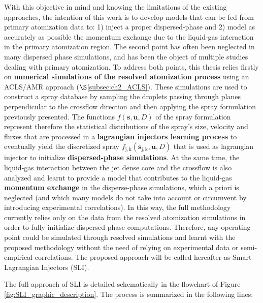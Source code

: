 With this objective in mind and knowing the limitations of the existing approaches, the intention of this work is to develop models that can be fed from primary atomization data to: 1) inject a proper dispersed-phase and 2) model as accurately as possible the momentum exchange due to the liquid-gas interaction in the primary atomization region. The second point has often been neglected in many dispersed phase simulations, and has been the object of multiple studies dealing with primary atomization. To address both points, this thesis relies firstly on \textbf{numerical simulations of the resolved atomization process} using an ACLS/AMR approach ($\S$\ref{subsec:ch2_ACLS}). These simulations are used to construct a spray database by sampling the droplets passing through planes perpendicular to the crossflow direction and then applying the spray formulation previously presented. The functions $f \left( \boldsymbol{s}, \boldsymbol{u}, D \right) $ of the spray formulation represent therefore the statistical distributions of the spray's size, velocity and fluxes that are processed in a \textbf{lagrangian injectors learning process} to eventually yield the discretized spray $f_\mathrm{j,k} \left( \boldsymbol{s}_\mathrm{j,k}, \boldsymbol{u}, D \right)$ that is used as lagrangian injector to initialize \textbf{dispersed-phase simulations}. At the same time, the liquid-gas interaction between the jet dense core and the crossflow is also analyzed and learnt to provide a model that contributes to the liquid-gas \textbf{momentum exchange} in the disperse-phase simulations, which a priori is neglected (and which many models do not take into account or circumvent by introducing experimental correlations). In this way, the full methodology currently relies only on the data from the resolved atomization simulations in order to fully initialize dispersed-phase computations. Therefore, any operating point could be simulated through resolved simulations and learnt with the proposed methodology without the need of relying on experimental data or semi-empirical correlations. The proposed approach will be called hereafter as Smart Lagrangian Injectors (SLI).

The full approach of SLI is detailed schematically in the flowchart of Figure \ref{fig:SLI_graphic_description}. The process is summarized in the following lines:


